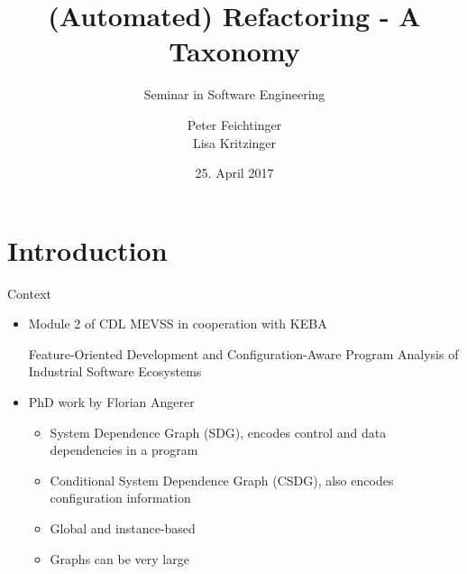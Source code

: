 \documentclass{beamer}
\title[Refactoring]{(Automated) Refactoring - A Taxonomy}
\subtitle{Seminar in Software Engineering}
\institute[]{Institute for Software Systems Engineering\\Johannes Kepler University Linz}
\author[Feichtinger, Kritzinger]{Peter Feichtinger\texorpdfstring{\\}{, }Lisa Kritzinger} %
\date{25. April 2017}
\begin{document}
\begin{frame}
  \titlepage
\end{frame}



\section{Introduction}  %

\begin{frame}{Context}
  \begin{itemize}
    \item Module 2 of CDL MEVSS in cooperation with KEBA
      
      Feature-Oriented Development and Configuration-Aware Program Analysis of Industrial Software Ecosystems
    \pause
    \item PhD work by Florian Angerer
    \begin{itemize}
      \item System Dependence Graph (SDG), encodes control and data dependencies in a program
      \pause
      \item Conditional System Dependence Graph (CSDG), also encodes configuration information
      \pause
      \item Global and instance-based
      \item Graphs can be very large
    \end{itemize}
  \end{itemize}
\end{frame}

%  
%
\end{document}
